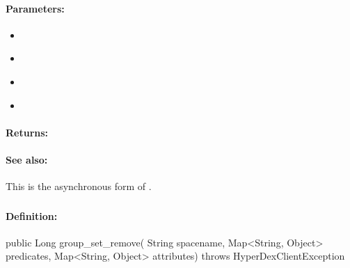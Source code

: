 \paragraph{Parameters:}
\begin{itemize}[noitemsep]
\item {}\\

\item {}\\

\item {}\\

\item {}\\

\end{itemize}

\paragraph{Returns:}


\paragraph{See also:}  This is the asynchronous form of .

\pagebreak
\subsubsection{}
\label{api:java:group_set_remove}


\paragraph{Definition:}
\begin{javacode}
public Long group_set_remove(
        String spacename,
        Map<String, Object> predicates,
        Map<String, Object> attributes) throws HyperDexClientException
\end{javacode}

